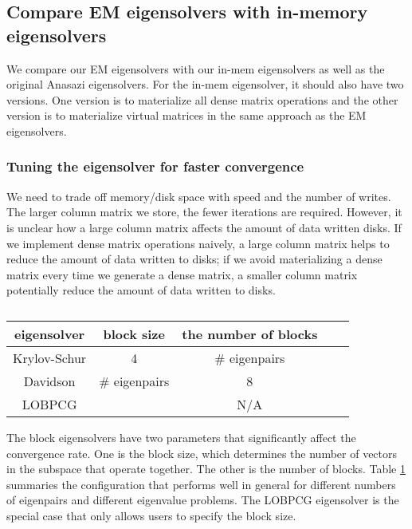 \subsection{Compare EM eigensolvers with in-memory eigensolvers}
We compare our EM eigensolvers with our in-mem eigensolvers as well as the original
Anasazi eigensolvers. For the in-mem eigensolver, it should also have two versions.
One version is to materialize all dense matrix operations and the other version is
to materialize virtual matrices in the same approach as the EM eigensolvers.

\subsubsection{Tuning the eigensolver for faster convergence}
We need to trade off memory/disk space with speed and the number of writes.
The larger column matrix we store, the fewer iterations are required. However,
it is unclear how a large column matrix affects the amount of data written disks.
If we implement dense matrix operations naively, a large column matrix helps to
reduce the amount of data written to disks; if we avoid materializing a dense
matrix every time we generate a dense matrix, a smaller column matrix potentially
reduce the amount of data written to disks.

\begin{table}
	\begin{center}
		\small
		\begin{tabular}{|c|c|c|c|c|}
			\hline
			eigensolver & block size & the number of blocks \\
			\hline
			Krylov-Schur & 4 & \# eigenpairs \\
			\hline
			Davidson & \# eigenpairs & 8 \\
			\hline
			LOBPCG &  & N/A \\
			\hline
		\end{tabular}
		\normalsize
	\end{center}
	\caption{}
	\label{eigen_conf}
\end{table}

The block eigensolvers have two parameters that significantly affect
the convergence rate. One is the block size, which determines the number
of vectors in the subspace that operate together. The other is the number
of blocks. Table \ref{eigen_conf} summaries the configuration that performs
well in general for different numbers of eigenpairs and different eigenvalue
problems. The LOBPCG eigensolver is the special case that only allows users
to specify the block size.

